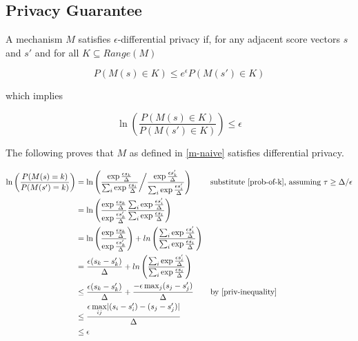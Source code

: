 \subsection{Privacy Guarantee}
\label{privacy-guarantee}
A mechanism $M$ satisfies $\epsilon$-differential privacy if, for any adjacent score vectors $s$ and $s'$ and for all $K \subseteq Range(M)$

\begin{equation}
    P(M(s) \in K) \leq e^\epsilon P(M(s') \in K)
\end{equation}

which implies

\begin{equation}
    \label{ln-defn}
    \ln\left(\frac{P(M(s) \in K)}{P(M(s') \in K)}\right)  \leq \epsilon
\end{equation}

The following proves that $M$ as defined in \ref{m-naive} satisfies differential privacy.

\begin{align*}
    \ln\left(\frac{P(M(s) = k)}{P(M(s') = k)}\right) &= \ln \left(
        \frac
            {\exp{\frac{\epsilon s_k}{\Delta}}}
            {\sum_{i} \exp{\frac{\epsilon s_i}{\Delta}}
        }
        \bigg/ \frac
            {\exp{\frac{\epsilon s'_k}{\Delta}}}
            {\sum_{i} \exp{\frac{\epsilon s'_i}{\Delta}}} \right)
        &&\text{substitute \ref{prob-of-k}, assuming } \tau \geq \Delta / \epsilon \\
    &= \ln \left(\frac
        {\exp{\frac{\epsilon s_k}{\Delta}}}{\exp{\frac{\epsilon s'_k}{\Delta}}}
        \frac{\sum_{i} \exp{\frac{\epsilon s'_i}{\Delta}}}{\sum_{i} \exp{\frac{\epsilon s_i}{\Delta}}}\right) \\
    &= \ln \left(\frac
        {\exp{\frac{\epsilon s_k}{\Delta}}}{\exp{\frac{\epsilon s'_k}{\Delta}}}\right) + ln \left(
        \frac{\sum_{i} \exp{\frac{\epsilon s'_i}{\Delta}}}{\sum_{i} \exp{\frac{\epsilon s_i}{\Delta}}}\right) \\
    &= \frac{\epsilon (s_k - s'_k)}{\Delta} 
        + ln\left(\frac{\sum_{i} \exp{\frac{\epsilon s'_i}{\Delta}}}{\sum_{i} \exp{\frac{\epsilon s_i}{\Delta}}}\right) \\
    &\leq \frac{\epsilon (s_k - s'_k)}{\Delta} + \frac{-\epsilon \max_j (s_j - s'_j)}{\Delta} &&\text{by \ref{priv-inequality}} \\
    &\leq \frac{\epsilon\max\limits_{ij} \lvert(s_i - s'_i) - (s_j - s'_j)\rvert}{\Delta} \\
    &\leq \epsilon
\end{align*}

